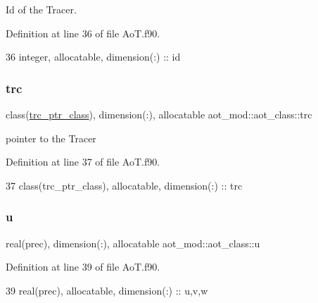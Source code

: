Id of the Tracer. 



Definition at line 36 of file Ao\+T.\+f90.


\begin{DoxyCode}
36         \textcolor{keywordtype}{integer}, \textcolor{keywordtype}{allocatable}, \textcolor{keywordtype}{dimension(:)} :: id
\end{DoxyCode}
\mbox{\label{structaot__mod_1_1aot__class_a9f05f9f23b3850d0e79a62d139a633c2}} 
\subsubsection{\texorpdfstring{trc}{trc}}
{\footnotesize\ttfamily class(\mbox{\hyperlink{structaot__mod_1_1trc__ptr__class}{trc\+\_\+ptr\+\_\+class}}), dimension(\+:), allocatable aot\+\_\+mod\+::aot\+\_\+class\+::trc\hspace{0.3cm}{\ttfamily [private]}}



pointer to the Tracer 



Definition at line 37 of file Ao\+T.\+f90.


\begin{DoxyCode}
37         \textcolor{keywordtype}{class}(trc\_ptr\_class), \textcolor{keywordtype}{allocatable}, \textcolor{keywordtype}{dimension(:)} :: trc
\end{DoxyCode}
\mbox{\label{structaot__mod_1_1aot__class_a3aab3baa9fb76719b7d2179d0be7879c}} 
\subsubsection{\texorpdfstring{u}{u}}
{\footnotesize\ttfamily real(prec), dimension(\+:), allocatable aot\+\_\+mod\+::aot\+\_\+class\+::u\hspace{0.3cm}{\ttfamily [private]}}



Definition at line 39 of file Ao\+T.\+f90.


\begin{DoxyCode}
39         \textcolor{keywordtype}{real(prec)}, \textcolor{keywordtype}{allocatable}, \textcolor{keywordtype}{dimension(:)} :: u,v,w
\end{DoxyCode}
\mbox{\label{structaot__mod_1_1aot__class_a5ff46826ac545ade3a41d66c174870f8}} 
